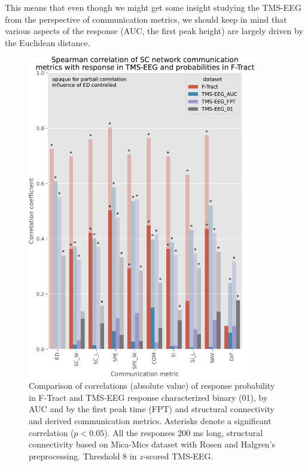 This means that even though we might get some insight studying the TMS-EEG from the perspective of communication metrics, we should keep in mind that various aspects of the response (AUC, the first peak height) are largely driven by the Euclidean distance. 

\begin{figure}
  \begin{center}
    \includegraphics[width=0.89\textwidth]{images/nootebook_generated/pytepfit_ftract_comparison_results_200ms/Spearman_correlation_of_SC_network_communication_metrics_with_response_in_TMS-EEG_and_probabilities_in_F-Tract.pdf}
  \end{center}
  \caption[Comparison of correlations for F-Tract and TMS-EEG]{Comparison of correlations (absolute value) of response probability in F-Tract and TMS-EEG response characterized binary (01), by AUC and by the first peak time (FPT) and structural connectivity and derived communication metrics. Asterisks denote a significant correlation ($p<0.05$). All the responses 200 ms long, structural connectivity based on Mica-Mics dataset with Rosen and Halgren's preprocessing. Threshold 8 in $z$-scored TMS-EEG.}
  \label{fig:compare-correlations_F-Tract-TMS}
\end{figure}

